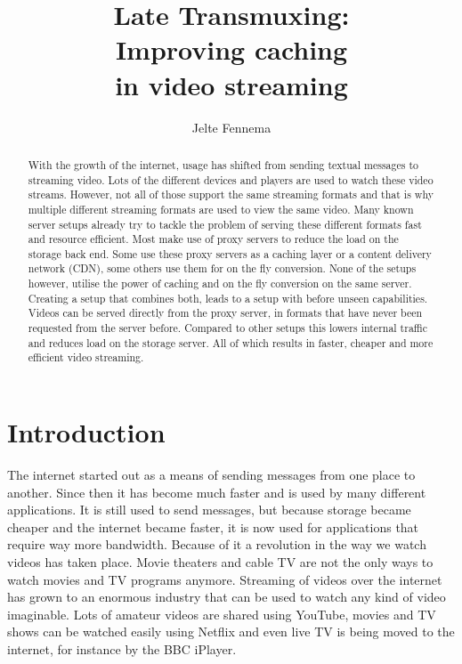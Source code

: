 \documentclass[twoside,openright]{uva-bachelor-thesis}
\title{Late Transmuxing:\\Improving caching \\in video streaming}
\author{Jelte Fennema}
\begin{document}
\maketitle

\begin{abstract}
    With the growth of the internet, usage has shifted from sending textual
    messages to streaming video. Lots of the different devices and
    players are used to watch these video streams. However, not all of those
    support the same streaming formats and that is why multiple different
    streaming formats are used to view the same video. Many known server setups
    already try to tackle the problem of serving these different formats fast
    and resource efficient. Most make use of proxy servers to reduce the load on
    the storage back end.  Some use these proxy servers as a caching layer or a
    content delivery network (CDN), some others use them for on the fly
    conversion. None of the setups however, utilise the power of caching and on
    the fly conversion on the same server. Creating a setup that combines both,
    leads to a setup with before unseen capabilities. Videos can be served
    directly from the proxy server, in formats that have never been requested
    from the server before.  Compared to other setups this lowers internal
    traffic and reduces load on the storage server. All of which results in
    faster, cheaper and more efficient video streaming.

\end{abstract}


\tableofcontents

\chapter{Introduction}
The internet started out as a means of sending messages from one place to
another. Since then it has become much faster and is used by many different
applications. It is still used to send messages, but because storage became
cheaper and the internet became faster, it is now used for applications that
require way more bandwidth. Because of it a revolution in the way we watch videos
has taken place. Movie theaters and cable TV are not the only ways to watch
movies and TV programs anymore. Streaming of videos over the internet has grown
to an enormous industry that can be used to watch any kind of video imaginable.
Lots of amateur videos are shared using YouTube, movies and TV shows can be
watched easily using Netflix and even live TV is being moved to the internet,
for instance by the BBC iPlayer.
\end{document}
